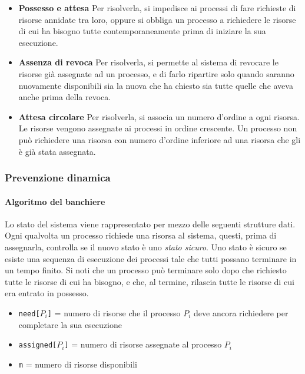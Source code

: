 \documentclass[12pt,a4paper]{article}
\begin{document}
\begin{itemize}
  \item \textbf{Possesso e attesa} Per risolverla, si impedisce ai
  processi di fare richieste di risorse annidate tra loro, oppure si
  obbliga un processo a richiedere le risorse di cui ha bisogno tutte
  contemporaneamente prima di iniziare la sua esecuzione.

  \item \textbf{Assenza di revoca} Per risolverla, si permette al
  sistema di revocare le risorse già assegnate ad un processo, e di
  farlo ripartire solo quando saranno nuovamente disponibili sia la
  nuova che ha chiesto sia tutte quelle che aveva anche prima della
  revoca.

  \item \textbf{Attesa circolare} Per risolverla, si associa un numero
  d'ordine a ogni risorsa. Le risorse vengono assegnate ai processi in
  ordine crescente. Un processo non può richiedere una risorsa con
  numero d'ordine inferiore ad una risorsa che gli è già stata
  assegnata.
\end{itemize}

\subsubsection{Prevenzione dinamica}
\paragraph{Algoritmo del banchiere}
Lo stato del sistema viene rappresentato per mezzo delle seguenti strutture
dati. Ogni qualvolta un processo richiede una risorsa al sistema, questi,
prima di assegnarla, controlla se il nuovo stato è uno \emph{stato sicuro}.
Uno stato è sicuro se esiste una sequenza di esecuzione dei processi tale
che tutti possano terminare in un tempo finito.
Si noti che un processo può terminare solo dopo che richiesto tutte le
risorse di cui ha bisogno, e che, al termine, rilascia tutte le risorse
di cui era entrato in possesso.

\begin{itemize}
  \item \texttt{need[$P_i$]} = numero di risorse che il processo $P_i$
    deve ancora richiedere per completare la sua esecuzione
  \item \texttt{assigned[$P_i$]} = numero di risorse assegnate al processo $P_i$
  \item \texttt{m} = numero di risorse disponibili
\end{itemize}
\end{document}
